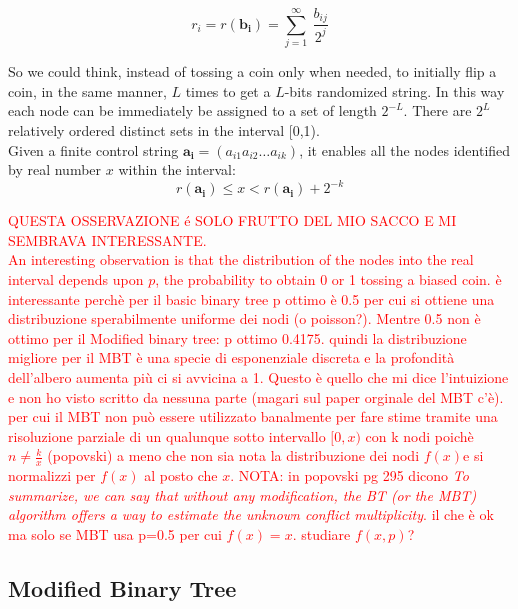 \documentclass[12pt,a4paper]{report}
\begin{document}
\begin{equation}
r_{i}=r(\mathbf{b_{i}})=\sum_{j=1}^{\infty} \ \frac{b_{ij}}{2^{j}}
\end{equation}

So we could think, instead of tossing a coin only when needed, to initially flip a coin, in the same manner, $L$ times to get a $L$-bits randomized string.
In this way each node can be immediately be assigned to a set of length $2^{-L}$. There are $2^{L}$ relatively ordered distinct sets in the interval [0,1).\\
Given a finite control string $\mathbf{a_{i}}=(a_{i1}a_{i2}\ldots a_{ik})$, it enables all the nodes identified by real number $x$ within the interval:
\begin{equation}
	r(\mathbf{a_{i}})\leq x <r(\mathbf{a_{i}})+2^{-k}
\end{equation}

\textcolor{red}{QUESTA OSSERVAZIONE é SOLO FRUTTO DEL MIO SACCO E MI SEMBRAVA INTERESSANTE.\\
An interesting observation is that the distribution of the nodes into the real interval depends upon $p$, the probability  to obtain 0 or 1 tossing a biased coin.
è interessante perchè per il basic binary tree p ottimo è 0.5 per cui si ottiene una distribuzione sperabilmente uniforme dei nodi (o poisson?). Mentre 0.5 non è ottimo per il Modified binary tree: p ottimo 0.4175. quindi la distribuzione migliore per il MBT è una specie di esponenziale discreta e la profondità dell'albero aumenta più ci si avvicina a 1. Questo è quello che mi dice l'intuizione e non ho visto scritto da nessuna parte (magari sul paper orginale del MBT c'è). per cui il MBT non può essere utilizzato banalmente per fare stime tramite una risoluzione parziale di un qualunque sotto intervallo $[0,x)$ con k nodi poichè $n \neq \frac{k}{x} $ (popovski) a meno che non sia nota la distribuzione dei nodi $f(x) $e si normalizzi per $f(x)$ al posto che $x$. 
NOTA: in popovski pg 295  dicono \emph{To summarize, we can say that without any modification, the BT (or the MBT) algorithm offers a way to estimate the unknown conflict multiplicity}. il che è ok ma solo se MBT usa p=0.5
per cui $f(x)=x$. studiare $f(x,p)$?}
\subsection{Modified Binary Tree}
\end{document}
